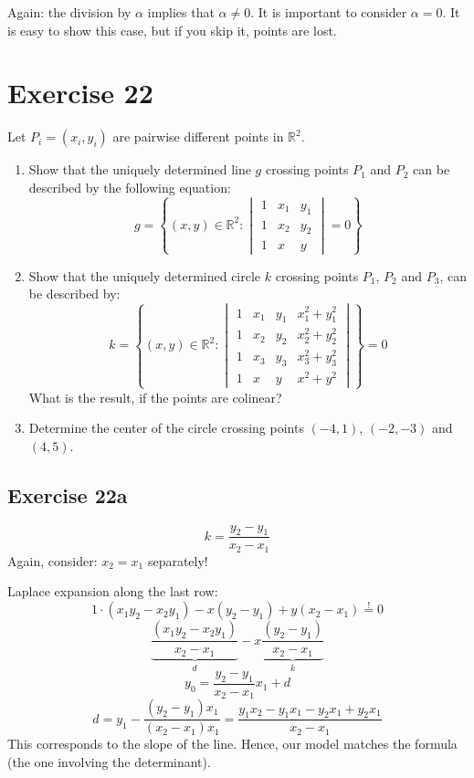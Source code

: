 \documentclass[a4paper]{article}
\theoremstyle{definition}
\newcommand\set[1]{\left\{#1\right\}}
\begin{document}
Again: the division by $\alpha$ implies that $\alpha \neq 0$. It is important to consider $\alpha = 0$. It is easy to show this case, but if you skip it, points are lost.

\section{Exercise 22}
\begin{ex}
  Let $P_i = (x_i, y_i)$ are pairwise different points in $\mathbb R^2$.
  \begin{enumerate}
    \item Show that the uniquely determined line $g$ crossing points $P_1$ and $P_2$ can be described by the following equation:
      \[ g = \set{(x,y) \in \mathbb R^2: \begin{vmatrix} 1 & x_1 & y_1 \\ 1 & x_2 & y_2 \\ 1 & x & y \end{vmatrix} = 0} \]
    \item Show that the uniquely determined circle $k$ crossing points $P_1$, $P_2$ and $P_3$,
      can be described by:
      \[
        k = \set{
          (x,y) \in \mathbb R^2:
          \begin{vmatrix}
            1 & x_1 & y_1 & x_1^2 + y_1^2 \\
            1 & x_2 & y_2 & x_2^2 + y_2^2 \\
            1 & x_3 & y_3 & x_3^2 + y_3^2 \\
            1 & x & y & x^2 + y^2
          \end{vmatrix}
        } = 0
      \]
      What is the result, if the points are colinear?
    \item Determine the center of the circle crossing points $(-4, 1)$, $(-2, -3)$ and $(4,5)$.
  \end{enumerate}
\end{ex}

\subsection{Exercise 22a}
\[ k =\frac{y_2 - y_1}{x_2 - x_1} \]
Again, consider: $x_2 = x_1$ separately!

Laplace expansion along the last row:
\[ 1 \cdot (x_1 y_2 - x_2 y_1) - x(y_2 - y_1) + y(x_2 - x_1) \overset!= 0 \]
\[
  \underbrace{\frac{(x_1 y_2 - x_2 y_1)}{x_2 - x_1}}_{d}
  - x \underbrace{\frac{(y_2 - y_1)}{x_2 - x_1}}_{k}
\] \[
  y_0 = \frac{y_2 - y_1}{x_2 - x_1} x_1 + d
\] \[
  d = y_1 - \frac{(y_2 - y_1) x_1}{(x_2 - x_1) x_1}
  = \frac{y_1 x_2 - y_1 x_1 - y_2 x_1 + y_2 x_1}{x_2 - x_1}
\]
This corresponds to the slope of the line. Hence, our model matches the formula (the one involving the determinant).
\end{document}
